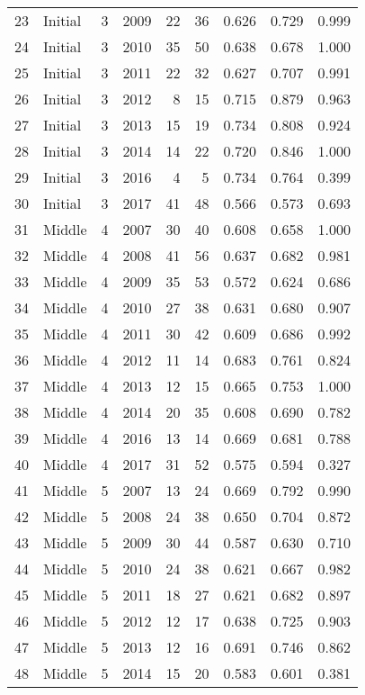 \begin{table}[ht]
\begin{tabular}{rlllrrrrr}
  23 & Initial & 3 & 2009 & 22 & 36 & 0.626 & 0.729 & 0.999 \\ 
  24 & Initial & 3 & 2010 & 35 & 50 & 0.638 & 0.678 & 1.000 \\ 
  25 & Initial & 3 & 2011 & 22 & 32 & 0.627 & 0.707 & 0.991 \\ 
  26 & Initial & 3 & 2012 & 8 & 15 & 0.715 & 0.879 & 0.963 \\ 
  27 & Initial & 3 & 2013 & 15 & 19 & 0.734 & 0.808 & 0.924 \\ 
  28 & Initial & 3 & 2014 & 14 & 22 & 0.720 & 0.846 & 1.000 \\ 
  29 & Initial & 3 & 2016 & 4 & 5 & 0.734 & 0.764 & 0.399 \\ 
  30 & Initial & 3 & 2017 & 41 & 48 & 0.566 & 0.573 & 0.693 \\ 
  31 & Middle & 4 & 2007 & 30 & 40 & 0.608 & 0.658 & 1.000 \\ 
  32 & Middle & 4 & 2008 & 41 & 56 & 0.637 & 0.682 & 0.981 \\ 
  33 & Middle & 4 & 2009 & 35 & 53 & 0.572 & 0.624 & 0.686 \\ 
  34 & Middle & 4 & 2010 & 27 & 38 & 0.631 & 0.680 & 0.907 \\ 
  35 & Middle & 4 & 2011 & 30 & 42 & 0.609 & 0.686 & 0.992 \\ 
  36 & Middle & 4 & 2012 & 11 & 14 & 0.683 & 0.761 & 0.824 \\ 
  37 & Middle & 4 & 2013 & 12 & 15 & 0.665 & 0.753 & 1.000 \\ 
  38 & Middle & 4 & 2014 & 20 & 35 & 0.608 & 0.690 & 0.782 \\ 
  39 & Middle & 4 & 2016 & 13 & 14 & 0.669 & 0.681 & 0.788 \\ 
  40 & Middle & 4 & 2017 & 31 & 52 & 0.575 & 0.594 & 0.327 \\ 
  41 & Middle & 5 & 2007 & 13 & 24 & 0.669 & 0.792 & 0.990 \\ 
  42 & Middle & 5 & 2008 & 24 & 38 & 0.650 & 0.704 & 0.872 \\ 
  43 & Middle & 5 & 2009 & 30 & 44 & 0.587 & 0.630 & 0.710 \\ 
  44 & Middle & 5 & 2010 & 24 & 38 & 0.621 & 0.667 & 0.982 \\ 
  45 & Middle & 5 & 2011 & 18 & 27 & 0.621 & 0.682 & 0.897 \\ 
  46 & Middle & 5 & 2012 & 12 & 17 & 0.638 & 0.725 & 0.903 \\ 
  47 & Middle & 5 & 2013 & 12 & 16 & 0.691 & 0.746 & 0.862 \\ 
  48 & Middle & 5 & 2014 & 15 & 20 & 0.583 & 0.601 & 0.381 \\ 

\end{tabular}
\end{table}
